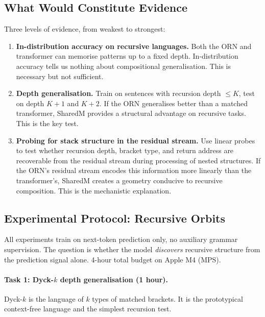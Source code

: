\documentclass[11pt, a4paper]{article}
\theoremstyle{plain}
\theoremstyle{definition}
\theoremstyle{remark}
\begin{document}
\subsection{What Would Constitute Evidence}

Three levels of evidence, from weakest to strongest:

\begin{enumerate}[leftmargin=*]
\item \textbf{In-distribution accuracy on recursive languages.}
    Both the ORN and transformer can memorise patterns up to a fixed depth.
    In-distribution accuracy tells us nothing about compositional generalisation.
    This is necessary but not sufficient.

\item \textbf{Depth generalisation.}
    Train on sentences with recursion depth $\leq K$, test on depth $K{+}1$ and $K{+}2$.
    If the ORN generalises better than a matched transformer, SharedM provides a structural advantage on recursive tasks.
    This is the key test.

\item \textbf{Probing for stack structure in the residual stream.}
    Use linear probes to test whether recursion depth, bracket type, and return address are recoverable from the residual stream during processing of nested structures.
    If the ORN's residual stream encodes this information more linearly than the transformer's, SharedM creates a geometry conducive to recursive composition.
    This is the mechanistic explanation.
\end{enumerate}

\subsection{Experimental Protocol: Recursive Orbits}
\label{sec:recursive-protocol}

All experiments train on next-token prediction only, no auxiliary grammar supervision.
The question is whether the model \emph{discovers} recursive structure from the prediction signal alone.
4-hour total budget on Apple M4 (MPS).

\paragraph{Task 1: Dyck-$k$ depth generalisation (1 hour).}
Dyck-$k$ is the language of $k$ types of matched brackets.
It is the prototypical context-free language and the simplest recursion test.
\end{document}

